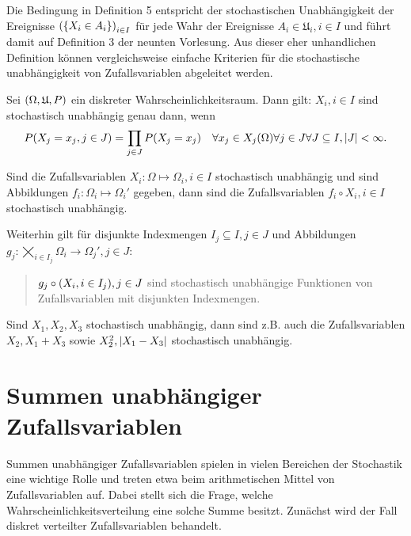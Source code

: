 \documentclass{lecture}
\begin{document}
    Die Bedingung in Definition 5 entspricht der stochastischen Unabhängigkeit der Ereignisse \(\parentheses*{\braces*{X_i \in A_i}}_{i \in I}\) für jede Wahr der Ereignisse \(A_i \in \mathfrak{U}_i, i \in I\) und führt damit auf Definition 3 der neunten Vorlesung.
    Aus dieser eher unhandlichen Definition können vergleichsweise einfache Kriterien für die stochastische unabhängigkeit von Zufallsvariablen abgeleitet werden.

    \begin{lemma}
        Sei \(\parentheses*{\Omega, \mathfrak{U}, P}\) ein diskreter Wahrscheinlichkeitsraum.
        Dann gilt: \(X_i, i \in I\) sind stochastisch unabhängig genau dann, wenn
        \[
            P\parentheses*{X_j = x_j, j \in J} = \prod_{j \in J}P\parentheses*{X_j = x_j} \quad \forall x_j \in X_j\parentheses*{\Omega} \forall j \in J \forall J \subseteq I, \absolute*{J} < \infty.
        \]
    \end{lemma}

    \begin{theorem}
        Sind die Zufallsvariablen \(X_i: \Omega \mapsto \Omega_i, i \in I\) stochastisch unabhängig und sind Abbildungen \(f_i: \Omega_i \mapsto \Omega_i'\) gegeben, dann sind die Zufallsvariablen \(f_i \circ X_i, i \in I\) stochastisch unabhängig.

        Weiterhin gilt für disjunkte Indexmengen \(I_j \subseteq I, j \in J\) und Abbildungen \(g_j: \bigtimes_{i \in I_j}\Omega_i \to \Omega_j', j \in J\):
        \begin{quote}
            \(g_j \circ \parentheses*{X_i, i \in I_j}, j \in J\) sind stochastisch unabhängige Funktionen von Zufallsvariablen mit disjunkten Indexmengen.
        \end{quote}
    \end{theorem}

    \begin{example}
        Sind \(X_1, X_2, X_3\) stochastisch unabhängig, dann sind z.B. auch die Zufallsvariablen \(X_2, X_1 + X_3\) sowie \(X_2^2, \absolute*{X_1 - X_3}\) stochastisch unabhängig.
    \end{example}


    \section*{Summen unabhängiger Zufallsvariablen}

    Summen unabhängiger Zufallsvariablen spielen in vielen Bereichen der Stochastik eine wichtige Rolle und treten etwa beim arithmetischen Mittel von Zufallsvariablen auf.
    Dabei stellt sich die Frage, welche Wahrscheinlichkeitsverteilung eine solche Summe besitzt.
    Zunächst wird der Fall diskret verteilter Zufallsvariablen behandelt.
\end{document}
